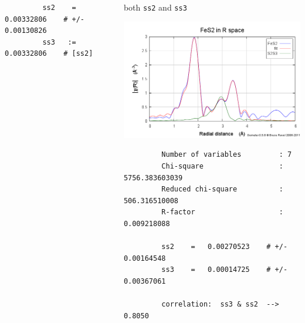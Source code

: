\documentclass[10pt, xcolor=x11names, compress, handout]{beamer}
\begin{document}
\begin{frame}[fragile]
\begin{columns}[T]
\begin{column}{0.5\linewidth}
\begin{verbatim}
         ss2    =   0.00332806    # +/-   0.00130826  
         ss3   :=   0.00332806    # [ss2]
\end{verbatim}
    \end{column}
    \begin{column}{0.5\linewidth}
      \begin{center}
        {\guessp} both \texttt{ss2} and \texttt{ss3}
      \end{center}
      \includegraphics[width=\linewidth]{images/free.png}
      \tiny
\begin{verbatim}
         Number of variables         : 7
         Chi-square                  : 5756.383603039
         Reduced chi-square          : 506.316510008
         R-factor                    : 0.009218088  

         ss2    =   0.00270523    # +/-   0.00164548
         ss3    =   0.00014725    # +/-   0.00367061

         correlation:  ss3 & ss2  -->  0.8050  
\end{verbatim}
    \end{column}
  \end{columns}
\end{frame}
\end{document}
